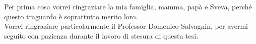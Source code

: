Per prima cosa vorrei ringraziare la mia famiglia, mamma, papà e Sveva, perché questo traguardo è soprattutto merito loro.\\
Vorrei ringraziare particolarmente il Professor Domenico Salvagnin, per avermi seguito con pazienza durante il lavoro di stesura di questa tesi. \\